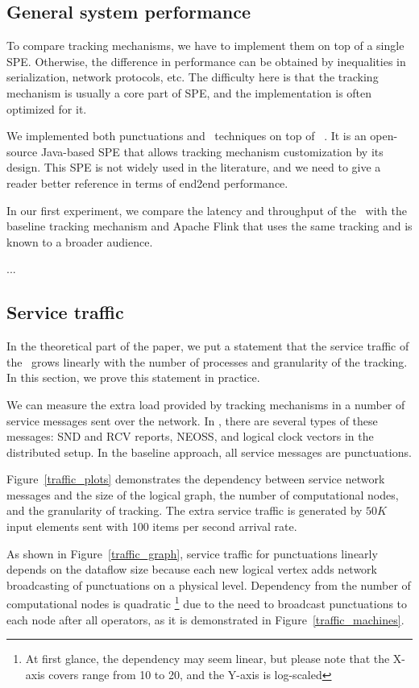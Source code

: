 \subsection{General system performance}
To compare tracking mechanisms, we have to implement them on top of a single SPE. Otherwise, the difference in performance can be obtained by inequalities in serialization, network protocols, etc.  The difficulty here is that the tracking mechanism is usually a core part of SPE, and the implementation is often optimized for it.

We implemented both punctuations and \tracker\ techniques on top of \FlameStream~\cite{we2018beyondmr}. It is an open-source Java-based SPE that allows tracking mechanism customization by its design. This SPE is not widely used in the literature, and we need to give a reader better reference in terms of end2end performance. 

In our first experiment, we compare the latency and throughput of the \FlameStream\ with the baseline tracking mechanism and Apache Flink that uses the same tracking and is known to a broader audience.

...

\subsection{Service traffic}
\label{exp_network_traffic}
In the theoretical part of the paper, we put a statement that the service traffic of the \tracker\ grows linearly with the number of processes and granularity of the tracking. In this section, we prove this statement in practice. 

We can measure the extra load provided by tracking mechanisms in a number of service messages sent over the network. In \tracker, there are several types of these messages: SND and RCV reports, NEOSS, and logical clock vectors in the distributed setup. In the baseline approach, all service messages are punctuations.

Figure~\ref{traffic_plots} demonstrates the dependency between service network messages and the size of the logical graph, the number of computational nodes, and the granularity of tracking. The extra service traffic is generated by $50K$ input elements sent with 100 items per second arrival rate. 

As shown in Figure~\ref{traffic_graph}, service traffic for punctuations linearly depends on the dataflow size because each new logical vertex adds network broadcasting of punctuations on a physical level. Dependency from the number of computational nodes is quadratic \footnote{At first glance, the dependency may seem linear, but please note that the X-axis covers range from 10 to 20, and the Y-axis is log-scaled} due to the need to broadcast punctuations to each node after all operators, as it is demonstrated in Figure~\ref{traffic_machines}. 

